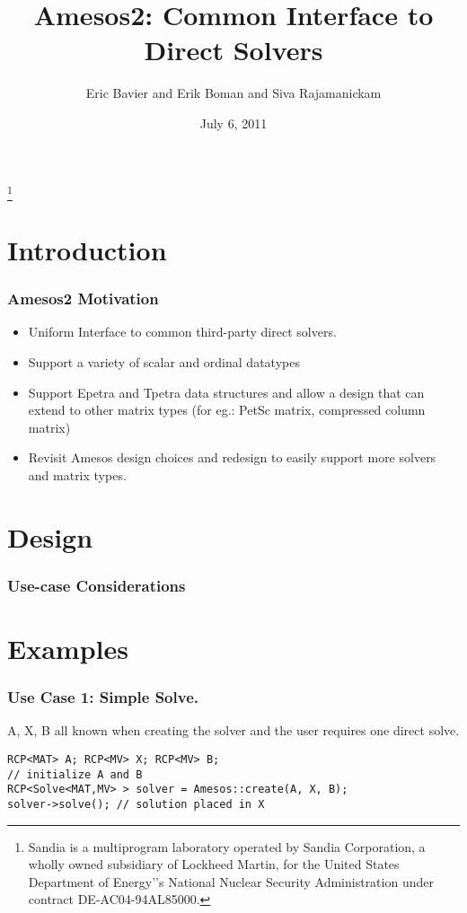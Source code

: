 \documentclass[xcolor=dvipsnames]{beamer}
\title[Amesos2]{Amesos2: Common Interface to Direct Solvers}
\author[Bavier,Boman,Rajamanickam]{Eric Bavier and Erik Boman and Siva Rajamanickam}
\institute[SNL]{
Sandia National Laboratories
}
\date[]{July 6, 2011}
\begin{document}
\begin{frame}[plain]
  \titlepage
  \footnote{\tiny{Sandia is a multiprogram laboratory operated by Sandia Corporation, a wholly owned subsidiary of Lockheed Martin, for the United States Department of Energy'’s National Nuclear Security Administration under contract DE-AC04-94AL85000.}}
\end{frame}

\section{Introduction}

\begin{frame}
  \frametitle{Amesos2 Motivation}
  
  \begin{itemize}
  \item Uniform Interface to common third-party direct solvers.
    \medskip
  \item Support a variety of scalar and ordinal datatypes
    \medskip
  \item Support Epetra and Tpetra data structures and allow a design that can
    extend to other matrix types (for eg.: PetSc matrix, compressed column
    matrix)
    \medskip
  \item Revisit Amesos design choices and redesign to easily support more
    solvers and matrix types.
  \end{itemize}
\end{frame}

\section{Design}

\begin{frame}
  \frametitle{Use-case Considerations}
\end{frame}

\section{Examples}

\begin{frame}[fragile]          %
  \frametitle{Use Case 1: Simple Solve.}
  A, X, B all known when creating the solver and the user requires one direct
  solve.
  \begin{lstlisting}
RCP<MAT> A; RCP<MV> X; RCP<MV> B;
// initialize A and B
RCP<Solve<MAT,MV> > solver = Amesos::create(A, X, B);
solver->solve(); // solution placed in X
  \end{lstlisting}
\end{frame}
\end{document}
